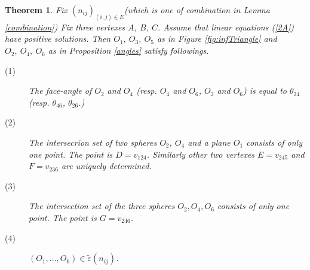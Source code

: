 \documentclass[suppldata, dvipdfmx]{interact}
\theoremstyle{plain}%
\newtheorem{theorem}{Theorem}[section]
\theoremstyle{definition}
\theoremstyle{remark}
\theoremstyle{problemstyle}
\begin{document}
\begin{theorem}\label{compat}
 Fix $(n_{ij})_{(i, j)\in E}$(which is one of combination in Lemma
 \ref{combination})
 Fix three vertexes $A,~B,~C$. Assume that linear equations (\ref{2A}) have
 positive solutions. Then $O_1,~O_3,~O_5$ as in Figure \ref{fig:infTriangle} and
 $O_2,~O_4,~O_6$ as in Proposition \ref{angles} satisfy followings.
 \begin{description}
  \item[(1)] The face-angle of $O_2$ and $O_4$ (resp. $O_4$ and $O_6$,
             $O_2$ and $O_6$) is equal to $\theta_{24}$
             (resp. $\theta_{46}$, $\theta_{26}$.)
  \item[(2)] The intersecrion set of two spheres $O_2$, $O_4$ and a plane
             $O_1$ consists of only one point. The point is 
             $D = v_{124}$. Similarly other two vertexes $E = v_{245}$
             and $F = v_{236}$ are uniquely determined.
  \item[(3)] The intersection set of the three spheres $O_2, O_4, O_6$
             consists of only one point. The point is $G = v_{246}$.
             
  \item[(4)] $(O_1, ..., O_6) \in \tilde\varepsilon(n_{ij})$.
\end{description}
\end{theorem}
\end{document}
